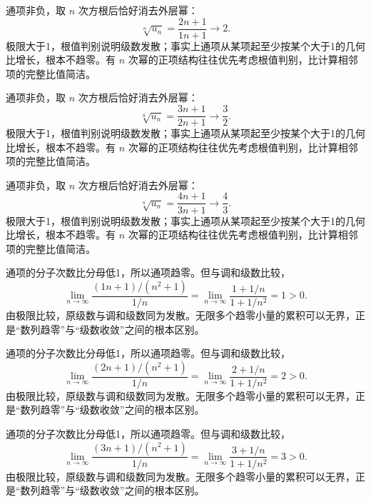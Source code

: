 \documentclass[12pt,fontset=fandol]{ctexart}
\begin{document}
\begin{solve}\label{ans:c25q10}
通项非负，取 $n$ 次方根后恰好消去外层幂：
\[
\sqrt[n]{u_n}=\frac{2n+1}{1n+1}\longrightarrow 2.
\]
极限大于1，根值判别说明级数发散；事实上通项从某项起至少按某个大于1的几何比增长，根本不趋零。有 $n$ 次幂的正项结构往往优先考虑根值判别，比计算相邻项的完整比值简洁。
\end{solve}

\begin{solve}\label{ans:c25q11}
通项非负，取 $n$ 次方根后恰好消去外层幂：
\[
\sqrt[n]{u_n}=\frac{3n+1}{2n+1}\longrightarrow \frac{3}{2}.
\]
极限大于1，根值判别说明级数发散；事实上通项从某项起至少按某个大于1的几何比增长，根本不趋零。有 $n$ 次幂的正项结构往往优先考虑根值判别，比计算相邻项的完整比值简洁。
\end{solve}

\begin{solve}\label{ans:c25q12}
通项非负，取 $n$ 次方根后恰好消去外层幂：
\[
\sqrt[n]{u_n}=\frac{4n+1}{3n+1}\longrightarrow \frac{4}{3}.
\]
极限大于1，根值判别说明级数发散；事实上通项从某项起至少按某个大于1的几何比增长，根本不趋零。有 $n$ 次幂的正项结构往往优先考虑根值判别，比计算相邻项的完整比值简洁。
\end{solve}

\begin{solve}\label{ans:c25q13}
通项的分子次数比分母低1，所以通项趋零。但与调和级数比较，
\[
\lim_{n\to\infty}\frac{(1n+1)/(n^2+1)}{1/n}=\lim_{n\to\infty}\frac{1+1/n}{1+1/n^2}=1>0.
\]
由极限比较，原级数与调和级数同为发散。无限多个趋零小量的累积可以无界，正是“数列趋零”与“级数收敛”之间的根本区别。
\end{solve}

\begin{solve}\label{ans:c25q14}
通项的分子次数比分母低1，所以通项趋零。但与调和级数比较，
\[
\lim_{n\to\infty}\frac{(2n+1)/(n^2+1)}{1/n}=\lim_{n\to\infty}\frac{2+1/n}{1+1/n^2}=2>0.
\]
由极限比较，原级数与调和级数同为发散。无限多个趋零小量的累积可以无界，正是“数列趋零”与“级数收敛”之间的根本区别。
\end{solve}

\begin{solve}\label{ans:c25q15}
通项的分子次数比分母低1，所以通项趋零。但与调和级数比较，
\[
\lim_{n\to\infty}\frac{(3n+1)/(n^2+1)}{1/n}=\lim_{n\to\infty}\frac{3+1/n}{1+1/n^2}=3>0.
\]
由极限比较，原级数与调和级数同为发散。无限多个趋零小量的累积可以无界，正是“数列趋零”与“级数收敛”之间的根本区别。
\end{solve}
\end{document}

